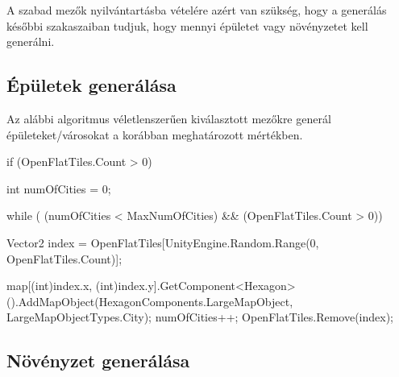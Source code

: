 A szabad mezők nyilvántartásba vételére azért van szükség, hogy a generálás későbbi szakaszaiban tudjuk, hogy mennyi épületet vagy növényzetet kell generálni.

\subsection{Épületek generálása}

Az alábbi algoritmus véletlenszerűen kiválasztott mezőkre generál épületeket/városokat a korábban meghatározott mértékben.
\begin{cpp}
if (OpenFlatTiles.Count > 0)
{
   int numOfCities = 0;
    
   while ( (numOfCities < MaxNumOfCities) && (OpenFlatTiles.Count > 0))
   {
      Vector2 index = OpenFlatTiles[UnityEngine.Random.Range(0, 
      OpenFlatTiles.Count)];

      map[(int)index.x, (int)index.y].GetComponent<Hexagon>
      ().AddMapObject(HexagonComponents.LargeMapObject, 
      LargeMapObjectTypes.City);
      numOfCities++;
      OpenFlatTiles.Remove(index);
   }
}
\end{cpp}

\subsection{Növényzet generálása}

